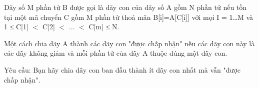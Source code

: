 Dãy số M phần tử B được gọi là dãy con của dãy số A gồm N phần tử nếu tồn tại một mã chuyển C gồm M phần tử thoả mãn B[i]=A[C[i]] với mọi I = 1…M và 1 ≤ C[1] $<$ C[2] $<$ ... $<$ C[m] ≤ N.  

   Một cách chia dãy A thành các dãy con "được chấp nhận" nếu các dãy con này là các dãy không giảm và mỗi phần tử của dãy A thuộc đúng một dãy con.  

   Yêu cầu: Bạn hãy chia dãy con ban đầu thành ít dãy con nhất mà vẫn "được chấp nhận".
